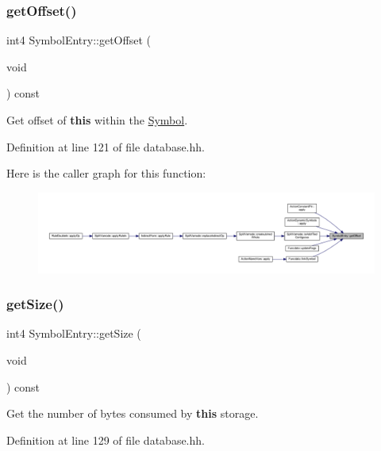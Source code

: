 \subsubsection{\texorpdfstring{getOffset()}{getOffset()}}
{\footnotesize\ttfamily int4 Symbol\+Entry\+::get\+Offset (\begin{DoxyParamCaption}\item[{void}]{ }\end{DoxyParamCaption}) const\hspace{0.3cm}{\ttfamily [inline]}}



Get offset of {\bfseries{this}} within the \mbox{\hyperlink{class_symbol}{Symbol}}. 



Definition at line 121 of file database.\+hh.

Here is the caller graph for this function\+:
\nopagebreak
\begin{figure}[H]
\begin{center}
\leavevmode
\includegraphics[width=350pt]{class_symbol_entry_a79274b1741dc33bbc57d5667b4df4eae_icgraph}
\end{center}
\end{figure}
\mbox{\label{class_symbol_entry_aced6757088dfc0497320dd6750aedf04}} 
\subsubsection{\texorpdfstring{getSize()}{getSize()}}
{\footnotesize\ttfamily int4 Symbol\+Entry\+::get\+Size (\begin{DoxyParamCaption}\item[{void}]{ }\end{DoxyParamCaption}) const\hspace{0.3cm}{\ttfamily [inline]}}



Get the number of bytes consumed by {\bfseries{this}} storage. 



Definition at line 129 of file database.\+hh.

